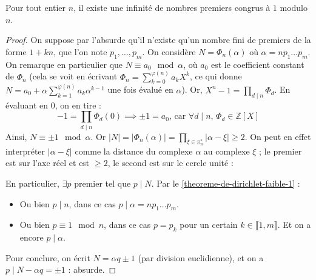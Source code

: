   \begin{theorem}
    Pour tout entier $n$, il existe une infinité de nombres premiers congrus à $1$ modulo $n$.
  \end{theorem}

  \begin{proof}
    On suppose par l'absurde qu'il n'existe qu'un nombre fini de premiers de la forme $1+kn$, que l'on note $p_1, \dots, p_m$. On considère $N = \Phi_n(\alpha)$ où $\alpha = n p_1 \dots p_m$. On remarque en particulier que $N \equiv a_0 \mod \alpha$, où $a_0$ est le coefficient constant de $\Phi_n$ (cela se voit en écrivant $\Phi_n = \sum_{k=0}^{\varphi(n)} a_k X^k$, ce qui donne $N = a_0 + \alpha \sum_{k=1}^{\varphi(n)} a_k \alpha^{k-1}$ une fois évalué en $\alpha$).
    \newpar
    Or, $X^n - 1 = \prod_{d \mid n} \Phi_d$. En évaluant en $0$, on en tire :
    \[ -1 = \prod_{d \mid n} \Phi_d(0) \implies \pm 1 = a_0 \text{, car } \forall d \mid n, \, \Phi_d \in \mathbb{Z}[X] \]
    Ainsi, $N \equiv \pm 1 \mod \alpha$. Or $|N| = |\Phi_n(\alpha)| = \prod_{\xi \in \pi_n^*} |\alpha - \xi| \geq 2$. On peut en effet interpréter $|\alpha - \xi|$ comme la distance du complexe $\alpha$ au complexe $\xi$ ; le premier est sur l'axe réel et est $\geq 2$, le second est sur le cercle unité :
    \begin{center}
    \end{center}
    En particulier, $\exists p$ premier tel que $p \mid N$. Par le \cref{theoreme-de-dirichlet-faible-1} :
    \begin{itemize}
      \item Ou bien $p \mid n$, dans ce cas $p \mid \alpha = n p_1 \dots p_m$.
      \item Ou bien $p \equiv 1 \mod n$, dans ce cas $p = p_k$ pour un certain $k \in \llbracket 1, m \rrbracket$. Et on a encore $p \mid \alpha$.
    \end{itemize}
    Pour conclure, on écrit $N = \alpha q \pm 1$ (par division euclidienne), et on a $p \mid N - \alpha q = \pm 1$ : absurde.
  \end{proof}

